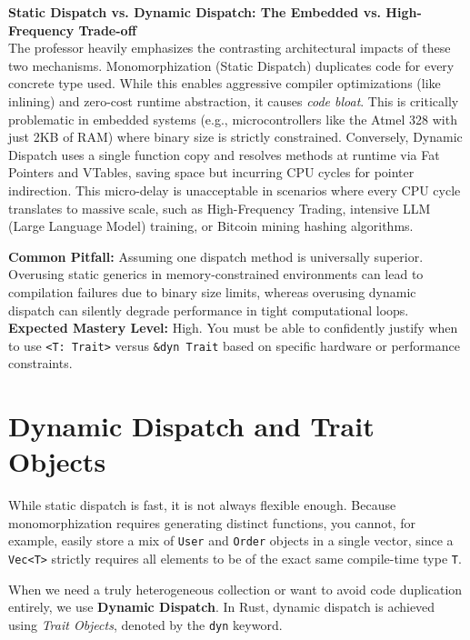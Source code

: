 \begin{examprioritybox}
\textbf{Static Dispatch vs. Dynamic Dispatch: The Embedded vs. High-Frequency Trade-off} \\
The professor heavily emphasizes the contrasting architectural impacts of these two mechanisms. Monomorphization (Static Dispatch) duplicates code for every concrete type used. While this enables aggressive compiler optimizations (like inlining) and zero-cost runtime abstraction, it causes \textit{code bloat}. This is critically problematic in embedded systems (e.g., microcontrollers like the Atmel 328 with just 2KB of RAM) where binary size is strictly constrained. Conversely, Dynamic Dispatch uses a single function copy and resolves methods at runtime via Fat Pointers and VTables, saving space but incurring CPU cycles for pointer indirection. This micro-delay is unacceptable in scenarios where every CPU cycle translates to massive scale, such as High-Frequency Trading, intensive LLM (Large Language Model) training, or Bitcoin mining hashing algorithms.

\textbf{Common Pitfall:} Assuming one dispatch method is universally superior. Overusing static generics in memory-constrained environments can lead to compilation failures due to binary size limits, whereas overusing dynamic dispatch can silently degrade performance in tight computational loops. \\
\textbf{Expected Mastery Level:} High. You must be able to confidently justify when to use \texttt{<T: Trait>} versus \texttt{\&dyn Trait} based on specific hardware or performance constraints.
\end{examprioritybox}

\section*{Dynamic Dispatch and Trait Objects}

While static dispatch is fast, it is not always flexible enough. Because monomorphization requires generating distinct functions, you cannot, for example, easily store a mix of \texttt{User} and \texttt{Order} objects in a single vector, since a \texttt{Vec<T>} strictly requires all elements to be of the exact same compile-time type \texttt{T}.

When we need a truly heterogeneous collection or want to avoid code duplication entirely, we use \textbf{Dynamic Dispatch}. In Rust, dynamic dispatch is achieved using \textit{Trait Objects}, denoted by the \texttt{dyn} keyword.

